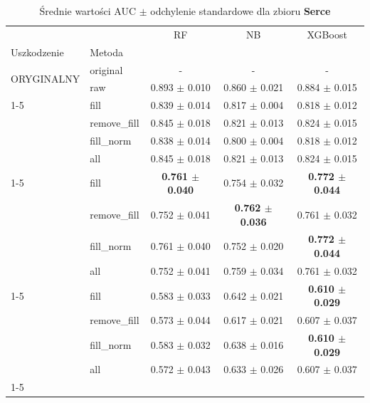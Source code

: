 \begin{table}[htbp]
\caption{Średnie wartości AUC $\pm$ odchylenie standardowe dla zbioru \textbf{Serce}}
\label{tab:wyniki_serce}
\begin{tabular}{llccc}
\toprule
 &  & RF & NB & XGBoost \\
Uszkodzenie & Metoda &  &  &  \\
\midrule
\multirow[t]{2}{*}{ORYGINALNY} & original & - & - & - \\
 & raw & 0.893 $\pm$ 0.010 & 0.860 $\pm$ 0.021 & 0.884 $\pm$ 0.015 \\
\cline{1-5}
\multirow[t]{5}{*}{20%
 & fill & 0.839 $\pm$ 0.014 & 0.817 $\pm$ 0.004 & 0.818 $\pm$ 0.012 \\
 & remove_fill & 0.845 $\pm$ 0.018 & 0.821 $\pm$ 0.013 & 0.824 $\pm$ 0.015 \\
 & fill_norm & 0.838 $\pm$ 0.014 & 0.800 $\pm$ 0.004 & 0.818 $\pm$ 0.012 \\
 & all & 0.845 $\pm$ 0.018 & 0.821 $\pm$ 0.013 & 0.824 $\pm$ 0.015 \\
\cline{1-5}
\multirow[t]{5}{*}{40%
 & fill & \textbf{0.761 $\pm$ 0.040} & 0.754 $\pm$ 0.032 & \textbf{0.772 $\pm$ 0.044} \\
 & remove_fill & 0.752 $\pm$ 0.041 & \textbf{0.762 $\pm$ 0.036} & 0.761 $\pm$ 0.032 \\
 & fill_norm & 0.761 $\pm$ 0.040 & 0.752 $\pm$ 0.020 & \textbf{0.772 $\pm$ 0.044} \\
 & all & 0.752 $\pm$ 0.041 & 0.759 $\pm$ 0.034 & 0.761 $\pm$ 0.032 \\
\cline{1-5}
\multirow[t]{5}{*}{60%
 & fill & 0.583 $\pm$ 0.033 & 0.642 $\pm$ 0.021 & \textbf{0.610 $\pm$ 0.029} \\
 & remove_fill & 0.573 $\pm$ 0.044 & 0.617 $\pm$ 0.021 & 0.607 $\pm$ 0.037 \\
 & fill_norm & 0.583 $\pm$ 0.032 & 0.638 $\pm$ 0.016 & \textbf{0.610 $\pm$ 0.029} \\
 & all & 0.572 $\pm$ 0.043 & 0.633 $\pm$ 0.026 & 0.607 $\pm$ 0.037 \\
\cline{1-5}
\bottomrule
\end{tabular}
\end{table}
